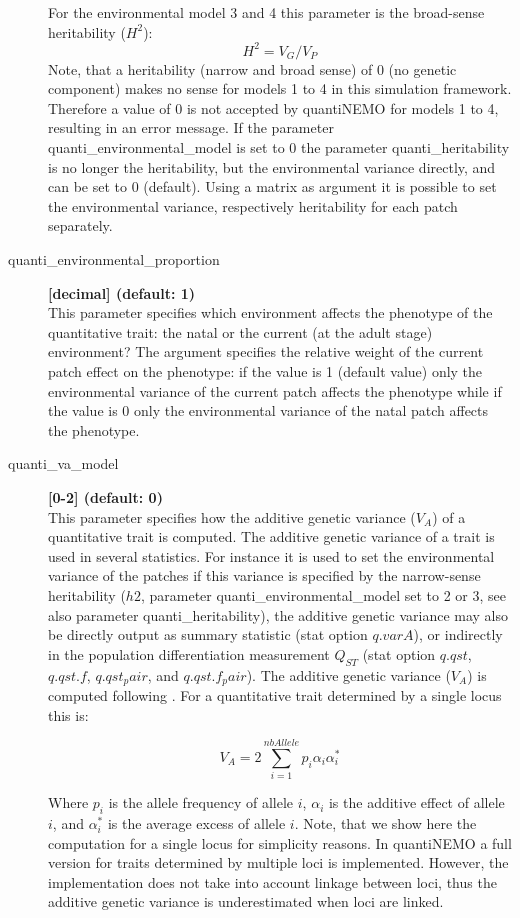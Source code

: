 \documentclass[letterpaper,12pt,oneside]{book}
\begin{document}
\begin{description}
For the environmental model 3 and 4 this parameter is the broad-sense heritability ($H^{2}$):
	\[H^{2} = V_{G}/V_{P}\]
Note, that a heritability (narrow and broad sense) of 0 (no genetic component) makes no sense for models 1 to 4 in this simulation framework. Therefore a value of 0 is not accepted by quantiNEMO for models 1 to 4, resulting in an error message. If the parameter \textsf{quanti\_environmental\_model} is set to 0 the parameter \textsf{quanti\_heritability} is no longer the heritability, but the environmental variance directly, and can be set to 0 (default). Using a matrix as argument it is possible to set the environmental variance, respectively heritability for each patch separately.

\item [quanti\_environmental\_proportion\index{quanti\_environmental\_proportion}] \textbf{[decimal] (default: 1)}\\
This parameter specifies which environment affects the phenotype of the quantitative trait: the natal or the current (at the adult stage) environment? The argument specifies the relative weight of the current patch effect on the phenotype: if the value is 1 (default value) only the environmental variance of the current patch affects the phenotype while if the value is 0 only the environmental variance of the natal patch affects the phenotype.

\item [quanti\_va\_model\index{quanti\_va\_model}] \textbf{[0-2] (default: 0)}\\
This parameter specifies how the additive genetic variance ($V_{A}$) of a quantitative trait is computed. The additive genetic variance of a trait is used in several statistics. For instance it is used to set the environmental variance of the patches if this variance is specified by the narrow-sense heritability ($h2$, parameter \textsf{quanti\_environmental\_model} set to 2 or 3, see also parameter \textsf{quanti\_heritability}), the additive genetic variance may also be directly output as summary statistic (stat option $q.varA$), or indirectly in the population differentiation measurement $Q_{ST}$ (stat option $q.qst$, $q.qst.f$, $q.qst_pair$, and $q.qst.f_pair$).
The additive genetic variance ($V_{A}$) is computed following \citet[p85-87]{Lynch_1998}. For a quantitative trait determined by a single locus this is:

\[ V_{A} = 2\sum_{i=1}^{nbAllele}p_{i}\alpha_{i}\alpha_{i}^{*} \]

Where $p_{i}$ is the allele frequency of allele $i$, $\alpha_{i}$ is the additive effect of allele $i$, and $\alpha_{i}^{*}$ is the average excess of allele $i$. Note, that we show here the computation for a single locus for simplicity reasons. In quantiNEMO a full version for traits determined by multiple loci is implemented. However, the implementation does not take into account linkage between loci, thus the additive genetic variance is underestimated when loci are linked.


\end{description}
\end{document}
